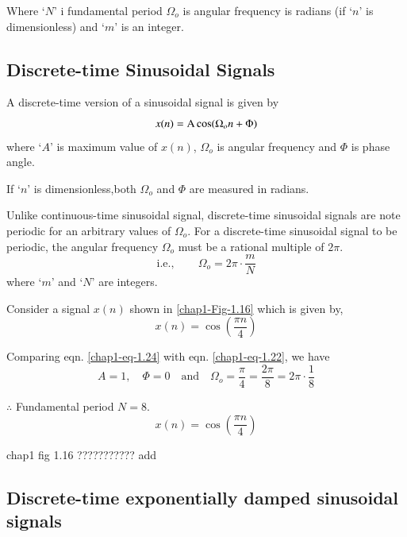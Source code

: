 Where `$N$' i fundamental period $\Omega_{o}$ is angular frequency is radians (if `$n$' is  dimensionless) and `$m$' is an integer.

\subsection{Discrete-time Sinusoidal Signals}\label{chap1-subsec-1.4.2}

A discrete-time version of a sinusoidal signal is given by
\begin{equation}
x(n) = \textrm{A} \cos (\Omega_{o}n + \Phi)\label{chap1-eq-1.22}
\end{equation}
where `$A$' is maximum value of $x(n)$, $\Omega_{o}$ is angular frequency and $\Phi$ is phase angle.

If `$n$' is dimensionless,both $\Omega_{o}$ and $\Phi$ are measured in radians.

Unlike continuous-time sinusoidal signal, discrete-time sinusoidal signals are note periodic for an arbitrary values of $\Omega_{o}$. For a discrete-time sinusoidal signal to be periodic, the angular frequency $\Omega_{o}$ must be a rational multiple of $2 \pi$.
\begin{equation}
\text{i.e.}, \qquad \Omega_{o} = 2 \pi\cdot \dfrac{m}{N}\label{chap1-eq-1.23}
\end{equation}
where `$m$' and `$N$' are integers.

Consider a signal $x(n)$ shown in \ref{chap1-Fig-1.16} which is given by,
\begin{equation}
x(n)= \cos\left(\dfrac{\pi n}{4}\right)\label{chap1-eq-1.24}
\end{equation}

Comparing eqn. \ref{chap1-eq-1.24} with eqn. \ref{chap1-eq-1.22}, we have
$$
A = 1, \quad \Phi = 0 \quad \text{and}\quad \Omega_{o} = \dfrac{\pi}{4} = \dfrac{2\pi}{ 8} = 2\pi\cdot \dfrac{1}{8} 
$$

$\therefore$ Fundamental period $N = 8$.
$$
x(n)= \cos \left(\dfrac{\pi n}{4} \right)
$$

\begin{center}
 chap1 fig 1.16 ??????????? add
\end{center}


\subsection{Discrete-time exponentially damped sinusoidal signals}\label{chap1-subsec-1.4.3}

